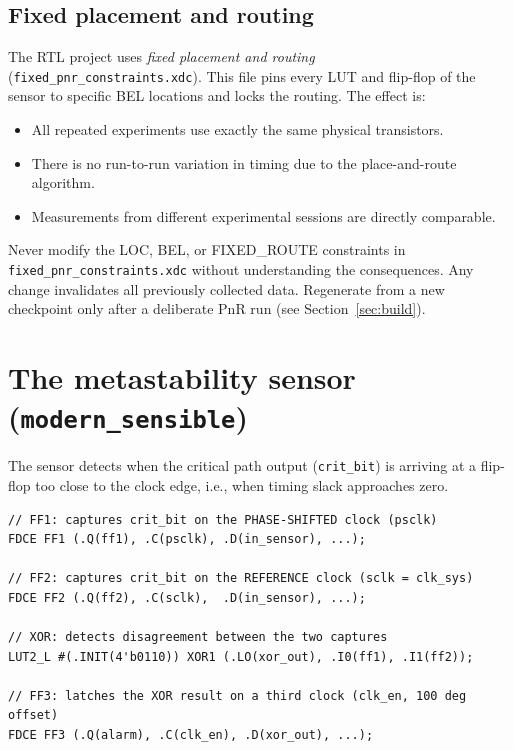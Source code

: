 \documentclass[12pt, a4paper]{report}
\begin{document}
\subsection{Fixed placement and routing}

The RTL project uses \emph{fixed placement and routing} (\texttt{fixed\_pnr\_constraints.xdc}).
This file pins every LUT and flip-flop of the sensor to specific BEL locations and
locks the routing. The effect is:

\begin{itemize}
  \item All repeated experiments use exactly the same physical transistors.
  \item There is no run-to-run variation in timing due to the place-and-route algorithm.
  \item Measurements from different experimental sessions are directly comparable.
\end{itemize}

\begin{warningbox}
Never modify the LOC, BEL, or FIXED\_ROUTE constraints in \texttt{fixed\_pnr\_constraints.xdc}
without understanding the consequences. Any change invalidates all previously collected data.
Regenerate from a new checkpoint only after a deliberate PnR run (see Section~\ref{sec:build}).
\end{warningbox}

\section{The metastability sensor (\texttt{modern\_sensible})}

The sensor detects when the critical path output (\texttt{crit\_bit}) is arriving
at a flip-flop too close to the clock edge, i.e., when timing slack approaches zero.

\begin{lstlisting}[style=verilog, caption={modern\_sensible.sv (simplified)}]
// FF1: captures crit_bit on the PHASE-SHIFTED clock (psclk)
FDCE FF1 (.Q(ff1), .C(psclk), .D(in_sensor), ...);

// FF2: captures crit_bit on the REFERENCE clock (sclk = clk_sys)
FDCE FF2 (.Q(ff2), .C(sclk),  .D(in_sensor), ...);

// XOR: detects disagreement between the two captures
LUT2_L #(.INIT(4'b0110)) XOR1 (.LO(xor_out), .I0(ff1), .I1(ff2));

// FF3: latches the XOR result on a third clock (clk_en, 100 deg offset)
FDCE FF3 (.Q(alarm), .C(clk_en), .D(xor_out), ...);
\end{lstlisting}
\end{document}
